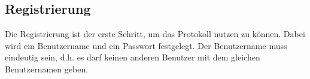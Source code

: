 \subsection{Registrierung}

Die Registrierung ist der erste Schritt, um das Protokoll nutzen zu können.
Dabei wird ein Benutzername und ein Passwort festgelegt. Der Benutzername muss eindeutig sein,
d.h. es darf keinen anderen Benutzer mit dem gleichen Benutzernamen geben.